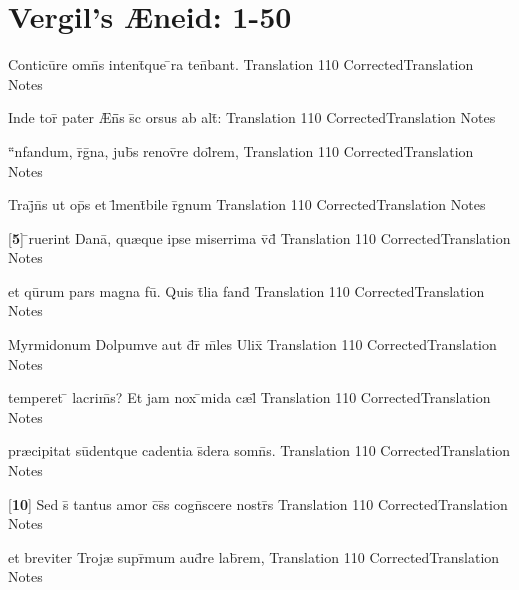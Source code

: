 \section{Vergil's {\AE}neid: 1-50} %

\latline
  {Conticu\={}re omn\={}s intent\={\macron {\i}}que \={}ra ten\={}bant.}
  { Translation }
  {110}
  { CorrectedTranslation }
  { Notes }


\latline
  {Inde tor\={} pater {\AE}n\={}\={}s s\={\macron {\i}}c orsus ab alt\={}:}
  { Translation }
  {110}
  { CorrectedTranslation }
  { Notes }


\latline
  {``\={}nfandum, r\={}g\={\macron {\i}}na, jub\={}s renov\={}re dol\={}rem,}
  { Translation }
  {110}
  { CorrectedTranslation }
  { Notes }


\latline
  {Traj\={}n\={}s ut op\={}s et l\={}ment\={}bile r\={}gnum}
  { Translation }
  {110}
  { CorrectedTranslation }
  { Notes }


\latline
  {[\textbf{5}] \={}ruerint Dana\={\macron {\i}}, qu{\ae}que ipse miserrima v\={\macron {\i}}d\={\macron {\i}}}
  { Translation }
  {110}
  { CorrectedTranslation }
  { Notes }


\latline
  {et qu\={}rum pars magna fu\={\macron {\i}}.  Quis t\={}lia fand\={}}
  { Translation }
  {110}
  { CorrectedTranslation }
  { Notes }


\latline
  {Myrmidonum Dolpumve aut d\={}r\={\macron {\i}} m\={\macron {\i}}les Ulix\={\macron {\i}}}
  { Translation }
  {110}
  { CorrectedTranslation }
  { Notes }


\latline
  {temperet \={} lacrim\={\macron {\i}}s?  Et jam nox \={}mida c{\ae}l\={}}
  { Translation }
  {110}
  { CorrectedTranslation }
  { Notes }


\latline
  {pr{\ae}cipitat su\={}dentque cadentia s\={\macron {\i}}dera somn\={}s.}
  { Translation }
  {110}
  { CorrectedTranslation }
  { Notes }


\latline
  {[\textbf{10}] Sed s\={\macron {\i}} tantus amor c\={}s\={}s cogn\={}scere nostr\={}s }
  { Translation }
  {110}
  { CorrectedTranslation }
  { Notes }


\latline
  {et breviter Troj{\ae} supr\={}mum aud\={\macron {\i}}re lab\={}rem,}
  { Translation }
  {110}
  { CorrectedTranslation }
  { Notes }


